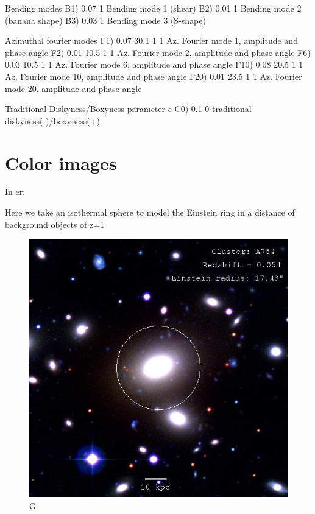   Bending modes
B1)  0.07      1        Bending mode 1 (shear)
B2)  0.01      1        Bending mode 2 (banana shape)
B3)  0.03      1        Bending mode 3 (S-shape)

  Azimuthal fourier modes
F1)  0.07  30.1  1  1   Az. Fourier mode 1, amplitude and phase angle
F2)  0.01  10.5  1  1   Az. Fourier mode 2, amplitude and phase angle
F6)  0.03  10.5  1  1  Az. Fourier mode 6, amplitude and phase angle
F10)  0.08  20.5  1  1   Az. Fourier mode 10, amplitude and phase angle
F20)  0.01  23.5  1  1   Az. Fourier mode 20, amplitude and phase angle

  Traditional Diskyness/Boxyness parameter c
C0) 0.1         0       traditional diskyness(-)/boxyness(+)

\section{Color images}


In er.  

Here we take an isothermal sphere to model the Einstein ring in a distance of background objects of z=1

\begin{figure}[H]
\centering
\includegraphics[width=12cm]{images/cA754.jpg}
\caption[M]{G}
\end{figure}

